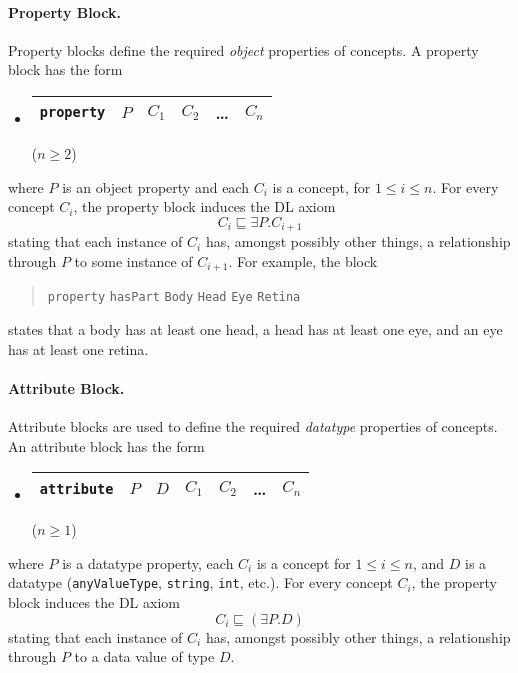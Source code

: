 \documentclass[11pt,onecolumn]{article}
\begin{document}
\paragraph{Property Block.} Property blocks define the required
\emph{object} properties of concepts. A property block has the form
\begin{itemize}
\item[]
  \begin{tabular}{|l|l|l|l|l|l|}\hline \texttt{property} & $P$ & $C_1$
& $C_2$ & \dots & $C_n$ \\ \hline
\end{tabular} \hfill ($n \ge 2$)
\end{itemize}
where $P$ is an object property and each $C_i$ is a concept, for $1
\le i \le n$.  For every concept $C_i$, the property block induces the
DL axiom \[C_i \sqsubseteq \exists P . C_{i+1} \] stating that each
instance of $C_i$ has, amongst possibly other things, a relationship
through $P$ to some instance of $C_{i+1}$.  For example, the block
\begin{quote}\texttt{property} \texttt{hasPart} \texttt{Body}
  \texttt{Head} \texttt{Eye} \texttt{Retina}
\end{quote} states that a body has at least one head, a head has at
least one eye, and an eye has at least one retina.

\paragraph{Attribute Block.} Attribute blocks are used to define the
required \emph{datatype} properties of concepts. An attribute block
has the form
\begin{itemize}
\item[]
  \begin{tabular}{|l|l|l|l|l|l|l|}\hline \texttt{attribute} & $P$ & $D$ & $C_1$
    & $C_2$ & \dots & $C_n$ \\ \hline
  \end{tabular} \hfill ($n \ge 1$)
\end{itemize}
where $P$ is a datatype property, each $C_i$ is a concept for $1 \le i
\le n$, and $D$ is a datatype (\texttt{anyValueType}, \texttt{string},
\texttt{int}, etc.). For every concept $C_i$, the property block
induces the DL axiom \[C_i \sqsubseteq (\exists P . D)\] stating that
each instance of $C_i$ has, amongst possibly other things, a
relationship through $P$ to a data value of type $D$.
\end{document}
